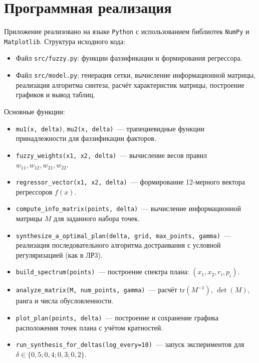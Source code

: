 \documentclass[a4paper,12pt]{article}
\begin{document}
\section{Программная реализация}

Приложение реализовано на языке \texttt{Python} с использованием
библиотек \texttt{NumPy} и \texttt{Matplotlib}.
Структура исходного кода:

\begin{itemize}
\item Файл \texttt{src/fuzzy.py}:
      функции фаззификации и формирования регрессора.
\item Файл \texttt{src/model.py}:
      генерация сетки, вычисление информационной матрицы,
      реализация алгоритма синтеза, расчёт характеристик матрицы,
      построение графиков и вывод таблиц.
\end{itemize}

Основные функции:

\begin{itemize}
\item \texttt{mu1(x, delta)}, \texttt{mu2(x, delta)}~---
      трапециевидные функции принадлежности для фаззификации факторов.
\item \texttt{fuzzy\_weights(x1, x2, delta)}~---
      вычисление весов правил $w_{11}, w_{12}, w_{21}, w_{22}$.
\item \texttt{regressor\_vector(x1, x2, delta)}~---
      формирование 12-мерного вектора регрессоров $f(x)$.
\item \texttt{compute\_info\_matrix(points, delta)}~---
      вычисление информационной матрицы $M$ для заданного набора точек.
\item \texttt{synthesize\_a\_optimal\_plan(delta, grid, max\_points, gamma)}~---
      реализация последовательного алгоритма достраивания с условной
      регуляризацией (как в ЛР3).
\item \texttt{build\_spectrum(points)}~---
      построение спектра плана: $(x_1, x_2, r_i, p_i)$.
\item \texttt{analyze\_matrix(M, num\_points, gamma)}~---
      расчёт $\mathrm{tr}(M^{-1})$, $\det(M)$, ранга и числа обусловленности.
\item \texttt{plot\_plan(points, delta)}~---
      построение и сохранение графика расположения точек плана
      с учётом кратностей.
\item \texttt{run\_synthesis\_for\_deltas(log\_every=10)}~---
      запуск экспериментов для $\delta \in \{0{,}5;0{,}4;0{,}3;0{,}2\}$.
\end{itemize}
\end{document}
